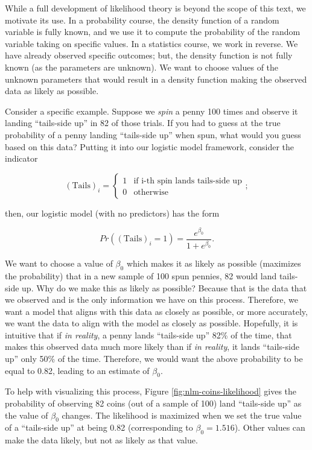 \documentclass[
]{book}
\theoremstyle{plain}
\theoremstyle{mydefn}
\theoremstyle{myexmpl}
\theoremstyle{remark}
\begin{document}
While a full development of likelihood theory is beyond the scope of this text, we motivate its use. In a probability course, the density function of a random variable is fully known, and we use it to compute the probability of the random variable taking on specific values. In a statistics course, we work in reverse. We have already observed specific outcomes; but, the density function is not fully known (as the parameters are unknown). We want to choose values of the unknown parameters that would result in a density function making the observed data as likely as possible.

Consider a specific example. Suppose we \emph{spin} a penny 100 times and observe it landing ``tails-side up'' in 82 of those trials. If you had to guess at the true probability of a penny landing ``tails-side up'' when spun, what would you guess based on this data? Putting it into our logistic model framework, consider the indicator

\[
(\text{Tails})_i = \begin{cases} 1 & \text{if i-th spin lands tails-side up} \\ 0 & \text{otherwise} \end{cases};
\]

then, our logistic model (with no predictors) has the form

\[Pr\left((\text{Tails})_i = 1\right) = \frac{e^{\beta_0}}{1 + e^{\beta_0}}.\]

We want to choose a value of \(\beta_0\) which makes it as likely as possible (maximizes the probability) that in a new sample of 100 spun pennies, 82 would land tails-side up. Why do we make this as likely as possible? Because that is the data that we observed and is the only information we have on this process. Therefore, we want a model that aligns with this data as closely as possible, or more accurately, we want the data to align with the model as closely as possible. Hopefully, it is intuitive that if \emph{in reality}, a penny lands ``tails-side up'' 82\% of the time, that makes this observed data much more likely than if \emph{in reality}, it lands ``tails-side up'' only 50\% of the time. Therefore, we would want the above probability to be equal to 0.82, leading to an estimate of \(\beta_0\).

To help with visualizing this process, Figure \ref{fig:nlm-coins-likelihood} gives the probability of observing 82 coins (out of a sample of 100) land ``tails-side up'' as the value of \(\beta_0\) changes. The likelihood is maximized when we set the true value of a ``tails-side up'' at being 0.82 (corresponding to \(\beta_0 = 1.516\)). Other values can make the data likely, but not as likely as that value.
\end{document}
